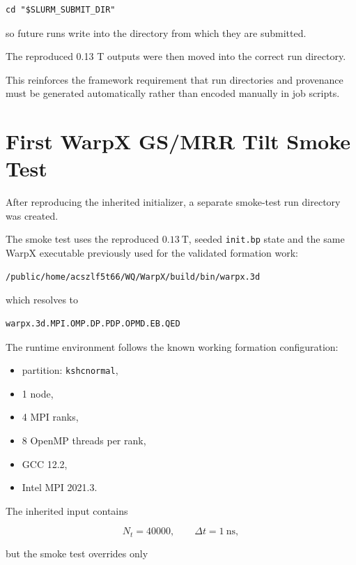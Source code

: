 \documentclass[11pt,a4paper]{article}
\begin{document}
\begin{lstlisting}
cd "$SLURM_SUBMIT_DIR"
\end{lstlisting}

so future runs write into the directory from which they are submitted.

The reproduced 0.13 T outputs were then moved into the correct run directory.

This reinforces the framework requirement that run directories and provenance
must be generated automatically rather than encoded manually in job scripts.

\section{First WarpX GS/MRR Tilt Smoke Test}

After reproducing the inherited initializer, a separate smoke-test run
directory was created.

The smoke test uses the reproduced \(0.13~\mathrm{T}\), seeded
\texttt{init.bp} state and the same WarpX executable previously used for the
validated formation work:

\begin{lstlisting}
/public/home/acszlf5t66/WQ/WarpX/build/bin/warpx.3d
\end{lstlisting}

which resolves to

\begin{lstlisting}
warpx.3d.MPI.OMP.DP.PDP.OPMD.EB.QED
\end{lstlisting}

The runtime environment follows the known working formation configuration:

\begin{itemize}
    \item partition: \texttt{kshcnormal},
    \item 1 node,
    \item 4 MPI ranks,
    \item 8 OpenMP threads per rank,
    \item GCC 12.2,
    \item Intel MPI 2021.3.
\end{itemize}

The inherited input contains

\[
N_t=40000,
\qquad
\Delta t=1~\mathrm{ns},
\]

but the smoke test overrides only
\end{document}
